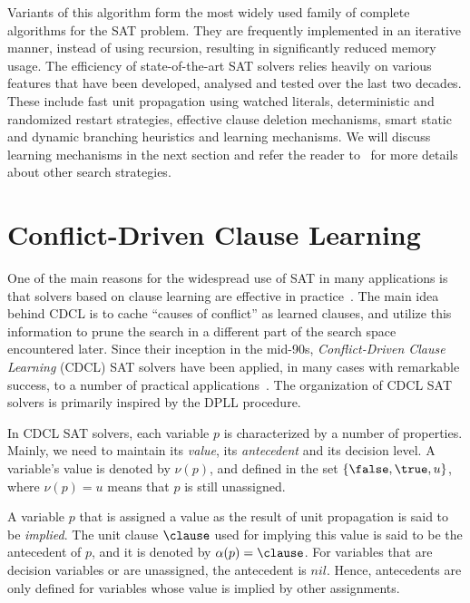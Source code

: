 Variants of this algorithm form the most widely used family of complete
algorithms for the SAT problem. They are frequently implemented in an iterative
manner, instead of using recursion, resulting in significantly reduced memory
usage. The efficiency of state-of-the-art SAT solvers relies heavily on various
features that have been developed, analysed and tested over the last two
decades. These include fast unit propagation using watched literals,
deterministic and randomized restart strategies, effective clause deletion
mechanisms, smart static and dynamic branching heuristics and learning
mechanisms. We will discuss learning mechanisms in the next section and refer
the reader to~\cite{satchapter} for more details about other search strategies.

\section{Conflict-Driven Clause Learning}%
\label{sec:cdcl}

One of the main reasons for the widespread use of SAT in many applications is
that solvers based on clause learning are effective in
practice~\cite{satchapter}. The main idea behind CDCL is to cache ``causes of
conflict'' as learned clauses, and utilize this information to prune the search
in a different part of the search space encountered later. Since their inception
in the mid-90s, \emph{Conflict-Driven Clause Learning} (CDCL) SAT solvers have
been applied, in many cases with remarkable success, to a number of practical
applications~\cite{cdclchapter}. The organization of CDCL SAT solvers is
primarily inspired by the DPLL procedure.

In CDCL SAT solvers, each variable $p$ is characterized by a number of
properties. Mainly, we need to maintain its \emph{value}, its \emph{antecedent}
and its decision level.  A variable's value is denoted by $\nu(p)$, and defined
in the set $\{\false, \true, u\}$, where $\nu(p) = u$ means that $p$ is still
unassigned. 

A variable $p$ that is assigned a value as the result of unit propagation is
said to be \emph{implied}.  The unit clause $\clause$ used for implying this
value is said to be the antecedent of $p$, and it is denoted by $\alpha(p) =
\clause$. For variables that are decision variables or are unassigned, the
antecedent is $nil$. Hence, antecedents are only defined for variables whose
value is implied by other assignments. 

